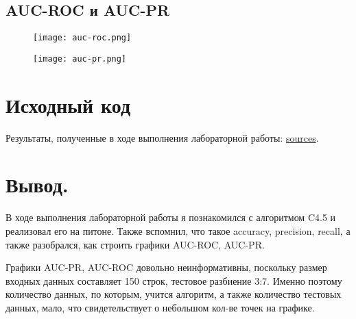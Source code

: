 \documentclass[11pt, a4paper]{article}
\begin{document}
\subsection{AUC-ROC и AUC-PR}

\begin{figure}[ht]
  \centering
  \texttt{[image: auc-roc.png]}
\end{figure}

\newpage

\begin{figure}[ht]
  \centering
  \texttt{[image: auc-pr.png]}
\end{figure}

\section{Исходный код}

 \noindent Результаты, полученные в ходе выполнения лабораторной работы: \href{https://github.com/zubrailx/University-ITMO/blob/main/Year-3/Artificial-intelligence/lab-3}{sources}.
 
\section{Вывод.}

\noindent В ходе выполнения лабораторной работы я познакомился с алгоритмом C4.5 и реализовал его на питоне. Также
вспомнил, что такое accuracy, precision, recall, а также разобрался, как строить графики AUC-ROC, AUC-PR.

\medskip
\noindent Графики AUC-PR, AUC-ROC довольно неинформативны, поскольку размер входных данных составляет 150 строк, тестовое разбиение 3:7. Именно поэтому количество данных, по которым, учится алгоритм, а также количество тестовых данных, мало, что свидетельствует о небольшом кол-ве точек на графике.
\end{document}

